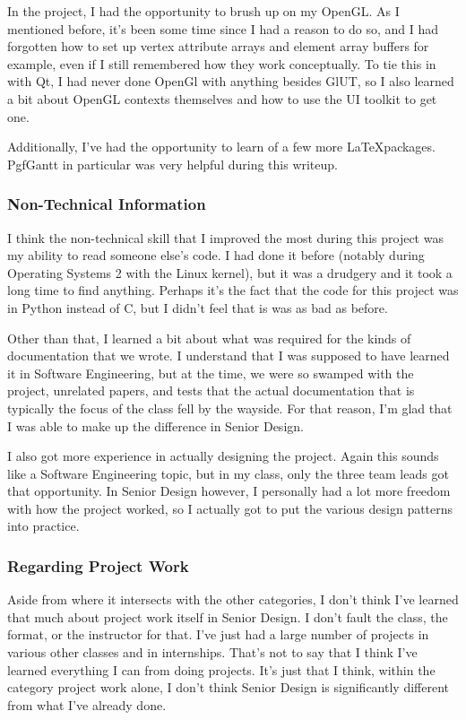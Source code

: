 \documentclass[letterpaper,10pt, onecolumn, draftclsnofoot]{IEEEtran}
\begin{document}
In the project, I had the opportunity to brush up on my OpenGL. As I mentioned before, it's been some time since I had a reason to do so, and I had forgotten how to set up vertex attribute arrays and element array buffers for example, even if I still remembered how they work conceptually. To tie this in with Qt, I had never done OpenGl with anything besides GlUT, so I also learned a bit about OpenGL contexts themselves and how to use the UI toolkit to get one.

Additionally, I've had the opportunity to learn of a few more \LaTeX packages. PgfGantt in particular was very helpful during this writeup. 

\subsubsection{Non-Technical Information}
I think the non-technical skill that I improved the most during this project was my ability to read someone else's code. I had done it before (notably during Operating Systems 2 with the Linux kernel), but it was a drudgery and it took a long time to find anything. Perhaps it's the fact that the code for this project was in Python instead of C, but I didn't feel that is was as bad as before.

Other than that, I learned a bit about what was required for the kinds of documentation that we wrote. I understand that I was supposed to have learned it in Software Engineering, but at the time, we were so swamped with the project, unrelated papers, and tests that the actual documentation that is typically the focus of the class fell by the wayside. For that reason, I'm glad that I was able to make up the difference in Senior Design.

I also got more experience in actually designing the project. Again this sounds like a Software Engineering topic, but in my class, only the three team leads got that opportunity. In Senior Design however, I personally had a lot more freedom with how the project worked, so I actually got to put the various design patterns into practice.

\subsubsection{Regarding Project Work}
Aside from where it intersects with the other categories, I don't think I've learned that much about project work itself in Senior Design. I don't fault the class, the format, or the instructor for that. I've just had a large number of projects in various other classes and in internships. That's not to say that I think I've learned everything I can from doing projects. It's just that I think, within the category project work alone, I don't think Senior Design is significantly different from what I've already done.
\end{document}
